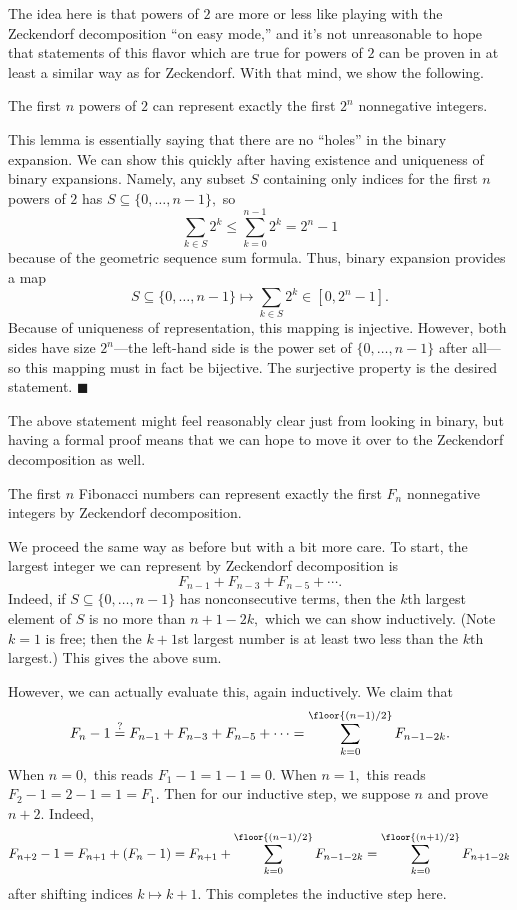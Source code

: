 The idea here is that powers of $2$ are more or less like playing with the Zeckendorf decomposition ``on easy mode,'' and it's not unreasonable to hope that statements of this flavor which are true for powers of $2$ can be proven in at least a similar way as for Zeckendorf. With that mind, we show the following.
\begin{lemma}
    The first $n$ powers of $2$ can represent exactly the first $2^n$ nonnegative integers.
\end{lemma}
This lemma is essentially saying that there are no ``holes'' in the binary expansion. We can show this quickly after having existence and uniqueness of binary expansions. Namely, any subset $S$ containing only indices for the first $n$ powers of $2$ has $S\subseteq\{0,\ldots,n-1\},$ so
\[\sum_{k\in S}2^k\le\sum_{k=0}^{n-1}2^k=2^n-1\]
because of the geometric sequence sum formula. Thus, binary expansion provides a map
\[S\subseteq\{0,\ldots,n-1\}\longmapsto\sum_{k\in S}2^k\in\left[0,2^n-1\right].\]
Because of uniqueness of representation, this mapping is injective. However, both sides have size $2^n$---the left-hand side is the power set of $\{0,\ldots,n-1\}$ after all---so this mapping must in fact be bijective. The surjective property is the desired statement. $\blacksquare$

The above statement might feel reasonably clear just from looking in binary, but having a formal proof means that we can hope to move it over to the Zeckendorf decomposition as well.
\begin{lemma}
    The first $n$ Fibonacci numbers can represent exactly the first $F_n$ nonnegative integers by Zeckendorf decomposition.
\end{lemma}
We proceed the same way as before but with a bit more care. To start, the largest integer we can represent by Zeckendorf decomposition is
\[F_{n-1}+F_{n-3}+F_{n-5}+\cdots.\]
Indeed, if $S\subseteq\{0,\ldots,n-1\}$ has nonconsecutive terms, then the $k$th largest element of $S$ is no more than $n+1-2k,$ which we can show inductively. (Note $k=1$ is free; then the $k+1$st largest number is at least two less than the $k$th largest.) This gives the above sum.

However, we can actually evaluate this, again inductively. We claim that
\[F_n-1\stackrel?=F_{n-1}+F_{n-3}+F_{n-5}+\cdots=\sum_{k=0}^{\floor{(n-1)/2}}F_{n-1-2k}.\]
When $n=0,$ this reads $F_1-1=1-1=0.$ When $n=1,$ this reads $F_2-1=2-1=1=F_1.$ Then for our inductive step, we suppose $n$ and prove $n+2.$ Indeed,
\[F_{n+2}-1=F_{n+1}+(F_n-1)=F_{n+1}+\sum_{k=0}^{\floor{(n-1)/2}}F_{n-1-2k}=\sum_{k=0}^{\floor{(n+1)/2}}F_{n+1-2k}\]
after shifting indices $k\mapsto k+1.$ This completes the inductive step here.

